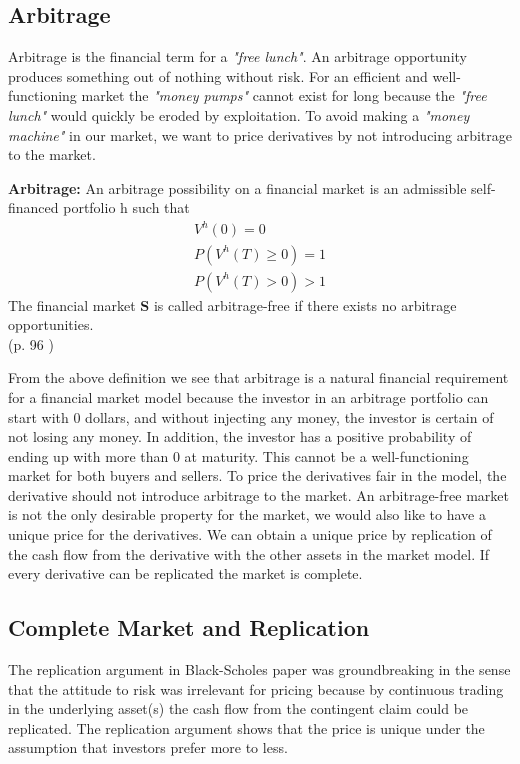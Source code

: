 \subsection{Arbitrage}
Arbitrage is the financial term for a \textsl{"free lunch"}. An arbitrage opportunity produces something out of nothing without risk. For an efficient and well-functioning market the \textsl{"money pumps"} cannot exist for long because the \textsl{"free lunch"} would quickly be eroded by exploitation. To avoid making a \textsl{"money machine"} in our market, we want to price derivatives by not introducing arbitrage to the market.  
\theoremstyle{definition}
\begin{definition}{\textbf{Arbitrage: }}\label{Arbitrage}
An arbitrage possibility on a financial market is an admissible self-financed portfolio h such that
\begin{equation*}
\begin{split}
V^{h}(0)=0\\
P(V^{h}(T)\geq 0)=1\\
P(V^{h}(T)>0)>1
\end{split}
\end{equation*}
The financial market $\bm{S}$ is called arbitrage-free if there exists no arbitrage opportunities.\\
\null \hfill (p. 96 \parencite{finKont})
\end{definition}
From the above definition we see that arbitrage is a natural financial requirement for a financial market model because the investor in an arbitrage portfolio can start with 0 dollars, and without injecting any money, the investor is certain of not losing any money. In addition, the investor has a positive probability of ending up with more than 0 at maturity. This cannot be a well-functioning market for both buyers and sellers. To price the derivatives fair in the model, the derivative should not introduce arbitrage to the market. An arbitrage-free market is not the only desirable property for the market, we would also like to have a unique price for the derivatives. We can obtain a unique price by replication of the cash flow from the derivative with the other assets in the market model. If every derivative can be replicated the market is complete. 


\subsection{Complete Market and Replication}
The replication argument in Black-Scholes paper \parencite{B-S-Paper} was groundbreaking in the sense that the attitude to risk was irrelevant for pricing because by continuous trading in the underlying asset(s) the cash flow from the contingent claim could be replicated. The replication argument shows that the price is unique under the assumption that investors prefer more to less.\\


